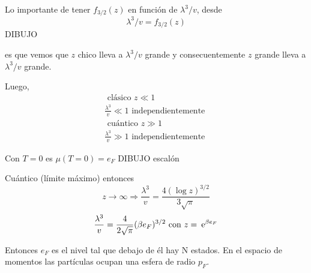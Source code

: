 \documentclass[10pt,oneside]{CBFT_book}
\begin{document}
Lo importante de tener $ f_{3/2}(z) $ en función de $ \lambda^3/v $, desde 
\[
	 \lambda^3/v  = f_{3/2}(z) 
\]
DIBUJO

es que vemos que $z$ chico lleva a $ \lambda^3/v $ grande y consecuentemente $z$ grande lleva a
$ \lambda^3/v $ grande.

Luego,
\begin{multline*}
	\text{ clásico } z \ll 1 \\
	\frac{ \lambda^3 }{ v } \ll 1 \text{ independientemente }
\end{multline*}
\begin{multline*}
	\text{ cuántico } z \gg 1 \\
	\frac{ \lambda^3 }{ v } \gg 1 \text{ independientemente }
\end{multline*}

Con $ T=0$ es $\mu(T=0)=e_F$
DIBUJO escalón

Cuántico (límite máximo) entonces
\[
	z \to \infty \Rightarrow \frac{ \lambda^3 }{ v } = \frac{4(\log z)^{3/2}}{3\sqrt{\pi}}
\]
\[
	\frac{ \lambda^3 }{ v } = \frac{4}{2\sqrt{\pi}}(\beta e_F)^{3/2} \text{ con } z=\:\mathrm{e}^{\beta e_F}
\]

Entonces $e_F$ es el nivel tal que debajo de él hay N estados. En el espacio de momentos las partículas
ocupan una esfera de radio $p_F$.


\end{document}
